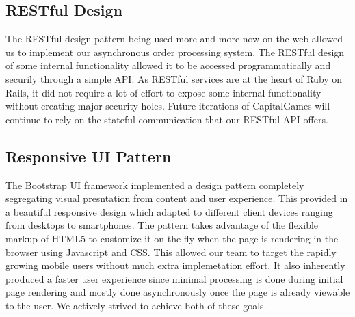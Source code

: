 \subsection{RESTful Design}
The RESTful design pattern being used more and more now on the web allowed us to implement our asynchronous order processing system. The RESTful design of some internal functionality allowed it to be accessed programmatically and securily through a simple API. As RESTful services are at the heart of Ruby on Rails, it did not require a lot of effort to expose some internal functionality without creating major security holes. Future iterations of CapitalGames will continue to rely on the stateful communication that our RESTful API offers.
\subsection{Responsive UI Pattern}
The Bootstrap UI framework implemented a design pattern completely segregating visual presntation from content and user experience. This provided in a beautiful responsive design which adapted to different client devices ranging from desktops to smartphones. The pattern takes advantage of the flexible markup of HTML5 to customize it on the fly when the page is rendering in the browser using Javascript and CSS. This allowed our team to target the rapidly growing mobile users without much extra implemetation effort. It also inherently produced a faster user experience since minimal processing is done during initial page rendering and mostly done asynchronously once the page is already viewable to the user. We actively strived to achieve both of these goals.